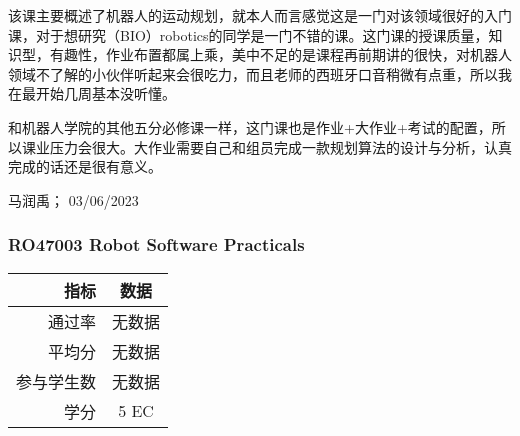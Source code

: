 该课主要概述了机器人的运动规划，就本人而言感觉这是一门对该领域很好的入门课，对于想研究（BIO）robotics的同学是一门不错的课。这门课的授课质量，知识型，有趣性，作业布置都属上乘，美中不足的是课程再前期讲的很快，对机器人领域不了解的小伙伴听起来会很吃力，而且老师的西班牙口音稍微有点重，所以我在最开始几周基本没听懂。

和机器人学院的其他五分必修课一样，这门课也是作业+大作业+考试的配置，所以课业压力会很大。大作业需要自己和组员完成一款规划算法的设计与分析，认真完成的话还是很有意义。

\begin{flushright}
马润禹； 03/06/2023
\end{flushright}

\subsubsection{RO47003 Robot Software Practicals}
\begin{minipage}{0.45\textwidth}
\centering
{}
\end{minipage}%
\begin{minipage}{0.45\textwidth}
\raggedleft
\begin{tabular}{r|c}
\textbf{指标} & \textbf{数据} \\ \hline
通过率 & 无数据 \\ 
平均分 & 无数据 \\ 
参与学生数 & 无数据 \\
学分 & 5 EC\\
\end{tabular}
\end{minipage}\\

